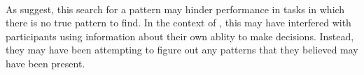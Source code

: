 \documentclass[12pt]{article}
\begin{document}

\paragraph{} As \cite{wolford2004searching} suggest, this search for a pattern may hinder performance in tasks in which there is no true pattern to find. In the context of \cite{clarke2015failure}, this may have interfered with participants using information about their own ablity to make decisions. Instead, they may have been attempting to figure out any patterns that they believed may have been present. %


\end{document}
